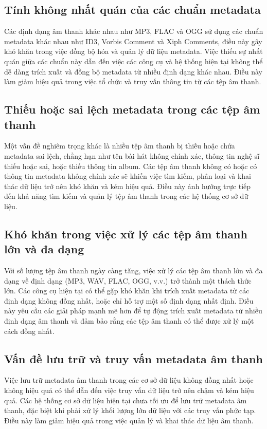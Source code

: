 \documentclass[conference]{IEEEtran}
\begin{document}
\subsection{Tính không nhất quán của các chuẩn metadata}

Các định dạng âm thanh khác nhau như MP3, FLAC và OGG sử dụng các chuẩn metadata khác nhau như ID3, Vorbis Comment và Xiph Comments, điều này gây khó khăn trong việc đồng bộ hóa và quản lý dữ liệu metadata. Việc thiếu sự nhất quán giữa các chuẩn này dẫn đến việc các công cụ và hệ thống hiện tại không thể dễ dàng trích xuất và đồng bộ metadata từ nhiều định dạng khác nhau. Điều này làm giảm hiệu quả trong việc tổ chức và truy vấn thông tin từ các tệp âm thanh.

\subsection{Thiếu hoặc sai lệch metadata trong các tệp âm thanh}

Một vấn đề nghiêm trọng khác là nhiều tệp âm thanh bị thiếu hoặc chứa metadata sai lệch, chẳng hạn như tên bài hát không chính xác, thông tin nghệ sĩ thiếu hoặc sai, hoặc thiếu thông tin album. Các tệp âm thanh không có hoặc có thông tin metadata không chính xác sẽ khiến việc tìm kiếm, phân loại và khai thác dữ liệu trở nên khó khăn và kém hiệu quả. Điều này ảnh hưởng trực tiếp đến khả năng tìm kiếm và quản lý tệp âm thanh trong các hệ thống cơ sở dữ liệu.

\subsection{Khó khăn trong việc xử lý các tệp âm thanh lớn và đa dạng}

Với số lượng tệp âm thanh ngày càng tăng, việc xử lý các tệp âm thanh lớn và đa dạng về định dạng (MP3, WAV, FLAC, OGG, v.v.) trở thành một thách thức lớn. Các công cụ hiện tại có thể gặp khó khăn khi trích xuất metadata từ các định dạng không đồng nhất, hoặc chỉ hỗ trợ một số định dạng nhất định. Điều này yêu cầu các giải pháp mạnh mẽ hơn để tự động trích xuất metadata từ nhiều định dạng âm thanh và đảm bảo rằng các tệp âm thanh có thể được xử lý một cách đồng nhất.

\subsection{Vấn đề lưu trữ và truy vấn metadata âm thanh}

Việc lưu trữ metadata âm thanh trong các cơ sở dữ liệu không đồng nhất hoặc không hiệu quả có thể dẫn đến việc truy vấn dữ liệu trở nên chậm và kém hiệu quả. Các hệ thống cơ sở dữ liệu hiện tại chưa tối ưu để lưu trữ metadata âm thanh, đặc biệt khi phải xử lý khối lượng lớn dữ liệu với các truy vấn phức tạp. Điều này làm giảm hiệu quả trong việc quản lý và khai thác dữ liệu âm thanh.
\end{document}
